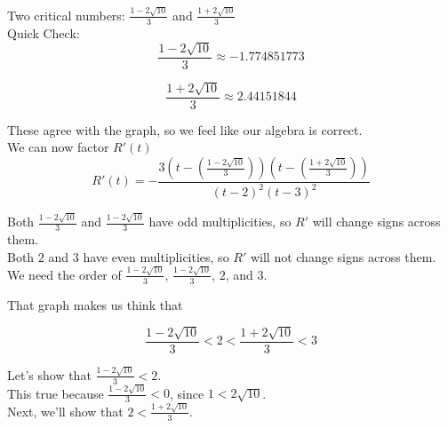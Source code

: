 \documentclass{ximera}
\begin{document}
\begin{example}
Two critical numbers: $\frac{1 - 2 \sqrt{10}}{3}$ and $\frac{1 + 2 \sqrt{10}}{3}$ \\




Quick Check:  \\


\[
\frac{1 - 2 \sqrt{10}}{3} \approx -1.774851773
\]


\[
\frac{1 + 2 \sqrt{10}}{3} \approx 2.44151844
\]


These agree with the graph, so we feel like our algebra is correct. \\



We can now factor $R'(t)$ \\








\[   
R'(t) = -\frac{3 \left(t - \left(\frac{1 - 2 \sqrt{10}}{3} \right) \right) \left(t - \left(\frac{1 + 2 \sqrt{10}}{3} \right) \right) }{ (t-2)^2 (t-3)^2 } 
\]


Both $\frac{1 - 2 \sqrt{10}}{3}$ and $\frac{1 - 2 \sqrt{10}}{3}$ have odd multiplicities, so $R'$ will change signs across them. \\




Both $2$ and $3$ have even multiplicities, so $R'$ will not change signs across them. \\



We need the order of $\frac{1 - 2 \sqrt{10}}{3}$, $\frac{1 - 2 \sqrt{10}}{3}$, $2$, and $3$.   \\



\begin{explanation}

That graph makes us think that 

\[
\frac{1 - 2 \sqrt{10}}{3} < 2 < \frac{1 + 2 \sqrt{10}}{3} < 3
\]


Let's show that $\frac{1 - 2 \sqrt{10}}{3} < 2$. \\

This true because $\frac{1 - 2 \sqrt{10}}{3} < 0$, since $1 < 2 \sqrt{10}$. \\



Next, we'll show that $2 < \frac{1 + 2 \sqrt{10}}{3}$. \\




\end{explanation}
\end{example}
\end{document}
